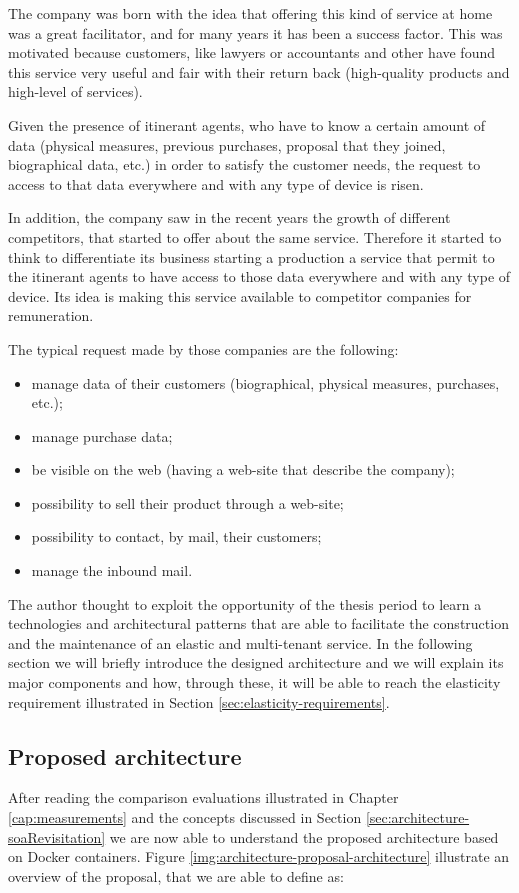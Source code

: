 The company was born with the idea that offering this kind of service at home was a great facilitator,
and for many years it has been a success factor. This was motivated because customers, like lawyers or
accountants and other have found this service very useful and fair with their return back (high-quality
products and high-level of services).

Given the presence of itinerant agents, who have to know a certain amount of data (physical measures,
previous purchases, proposal that they joined, biographical data, etc.) in order to satisfy the customer
needs, the request to access to that data everywhere and with any type of device is risen.

In addition, the company saw in the recent years the growth of different competitors, that started to offer
about the same service. Therefore it started to think to differentiate its business starting a production
a service that permit to the itinerant agents to have access to those data everywhere and with any type
of device. Its idea is making this service available to competitor companies for remuneration.

The typical request made by those companies are the following:

\begin{itemize}
	\item{manage data of their customers (biographical, physical measures, purchases, etc.);}
	\item{manage purchase data;}
	\item{be visible on the web (having a web-site that describe the company);}
	\item{possibility to sell their product through a web-site;}
	\item{possibility to contact, by mail, their customers;}
	\item{manage the inbound mail.}
\end{itemize}

The author thought to exploit the opportunity of the thesis period to learn a technologies and architectural
patterns that are able to facilitate the construction and the maintenance of an elastic and multi-tenant
service. In the following section we will briefly introduce the designed architecture and we will explain
its major components and how, through these, it will be able to reach the elasticity requirement illustrated in
Section \ref{sec:elasticity-requirements}.

\subsection{Proposed architecture}
\label{sec:architecture-proposal-architecture}
After reading the comparison evaluations illustrated in Chapter \ref{cap:measurements} and the concepts
discussed in Section \ref{sec:architecture-soaRevisitation} we are now able to understand the proposed
architecture based on Docker containers. Figure \ref{img:architecture-proposal-architecture} illustrate an
overview of the proposal, that we are able to define as:

